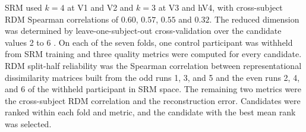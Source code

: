 

SRM used $k = 4$ at V1 and V2 and $k = 3$ at V3 and hV4, with cross-subject RDM Spearman correlations of $0.60$, $0.57$, $0.55$ and $0.32$. The reduced dimension was determined by leave-one-subject-out cross-validation over the candidate values 2 to 6 \parencite{cunningham2014}. On each of the seven folds, one control participant was withheld from SRM training and three quality metrics were computed for every candidate. RDM split-half reliability was the Spearman correlation between representational dissimilarity matrices built from the odd runs 1, 3, and 5 and the even runs 2, 4, and 6 of the withheld participant in SRM space. The remaining two metrics were the cross-subject RDM correlation and the reconstruction error. Candidates were ranked within each fold and metric, and the candidate with the best mean rank was selected.




